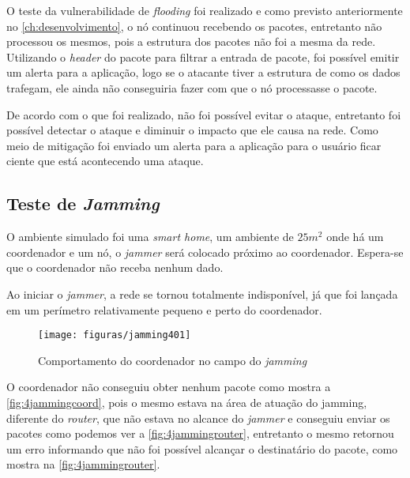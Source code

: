 \par O teste da vulnerabilidade de \emph{flooding} foi realizado e como previsto anteriormente no \autoref{ch:desenvolvimento}, o n\'o continuou recebendo os pacotes, entretanto n\~ao processou os mesmos, pois a estrutura dos pacotes n\~ao foi a mesma da rede. Utilizando o \emph{header} do pacote para filtrar a entrada de pacote, foi poss\'ivel emitir um alerta para a aplica\c{c}\~ao, logo se o atacante tiver a estrutura de como os dados trafegam, ele ainda n\~ao conseguiria fazer com que o n\'o processasse o pacote.

\par De acordo com o que foi realizado, n\~ao foi poss\'ivel evitar o ataque, entretanto foi poss\'ivel detectar o ataque e diminuir o impacto que ele causa na rede. Como meio de mitiga\c{c}\~ao foi enviado um alerta para a aplica\c{c}\~ao para o usu\'ario ficar ciente que est\'a acontecendo uma ataque.

\subsection{Teste de \emph{Jamming}}
\par O ambiente simulado foi uma \emph{smart home}, um ambiente de $25m^{2}$ onde h\'a um coordenador e um n\'o, o \emph{jammer} ser\'a colocado pr\'oximo ao coordenador. Espera-se que o coordenador n\~ao receba nenhum dado.

Ao iniciar o \emph{jammer}, a rede se tornou totalmente indispon\'ivel, j\'a que foi lan\c{c}ada em um per\'imetro relativamente pequeno e perto do coordenador.

\begin{figure}[H]
    \centering
    \caption{Comportamento do coordenador no campo do \emph{jamming}}
    \texttt{[image: figuras/jamming401]}
    \label{fig:4jammingcoord}
\end{figure}

\par O coordenador n\~ao conseguiu obter nenhum pacote como mostra a \autoref{fig:4jammingcoord}, pois o mesmo estava na \'area de atua\c{c}\~ao do jamming, diferente do \emph{router}, que n\~ao estava no alcance do \emph{jammer} e conseguiu enviar os pacotes como podemos ver a \autoref{fig:4jammingrouter}, entretanto o mesmo retornou um erro informando que n\~ao foi poss\'ivel alcan\c{c}ar o destinat\'ario do pacote, como mostra na \autoref{fig:4jammingrouter}.


